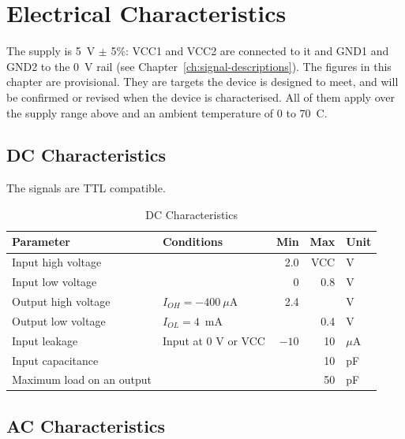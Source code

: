 \chapter{Electrical Characteristics}
\label{ch:electrical-characteristics}

The supply is 5~V $\pm$ 5\%: VCC1 and VCC2 are connected to it and GND1 and GND2 to the 0~V rail (see
Chapter~\ref{ch:signal-descriptions}). The figures in this chapter are provisional. They are targets the device is
designed to meet, and will be confirmed or revised when the device is characterised. All of them apply over the supply
range above and an ambient temperature of 0 to 70~\textdegree{}C.

\section{DC Characteristics}

The signals are TTL compatible.

\begin{table}[H]
	\centering
	\begin{tabular}{llrrl}
		\toprule
		\textbf{Parameter}        & \textbf{Conditions}  & \textbf{Min} & \textbf{Max} & \textbf{Unit} \\
		\midrule
		Input high voltage        &                      & 2.0          & VCC          & V             \\
		Input low voltage         &                      & 0            & 0.8          & V             \\
		Output high voltage       & $I_{OH} = -400~\mu$A & 2.4          &              & V             \\
		Output low voltage        & $I_{OL} = 4$~mA      &              & 0.4          & V             \\
		Input leakage             & Input at 0 V or VCC  & $-10$        & 10           & $\mu$A        \\
		Input capacitance         &                      &              & 10           & pF            \\
		Maximum load on an output &                      &              & 50           & pF            \\
		\bottomrule
	\end{tabular}
	\caption{DC Characteristics}
	\label{tab:dc-characteristics}
\end{table}

\section{AC Characteristics}

